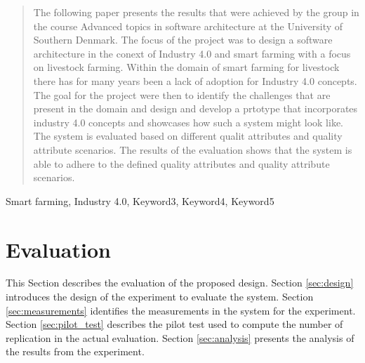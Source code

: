 \documentclass[conference]{IEEEtran}
\begin{document}
\maketitle
\IEEEpubidadjcol
\begin{abstract}





    The following paper presents the results that were achieved by the group in the course Advanced topics in software architecture at the University of Southern Denmark. The focus of the project was to design a software architecture in the conext of Industry 4.0 and smart farming with a focus on livestock farming. Within the domain of smart farming for livestock there has for many years been a lack of adoption for Industry 4.0 concepts. The goal for the project were then to identify the challenges that are present in the domain and design and develop a prtotype that incorporates industry 4.0 concepts and showcases how such a system might look like. The system is evaluated based on different qualit attributes and quality attribute scenarios. The results of the evaluation shows that the system is able to adhere to the defined quality attributes and quality attribute scenarios.
\end{abstract}

\begin{IEEEkeywords}
    Smart farming, Industry 4.0, Keyword3, Keyword4, Keyword5
\end{IEEEkeywords}














\section{Evaluation}
\label{sec:evaluation}
This Section describes the evaluation of the proposed design.
Section \ref{sec:design} introduces the design of the experiment to evaluate the system.
Section \ref{sec:measurements} identifies the measurements in the system for the experiment.
Section \ref{sec:pilot_test} describes the pilot test used to compute the number of replication in the actual evaluation.
Section \ref{sec:analysis} presents the analysis of the results from the experiment.
\end{document}
